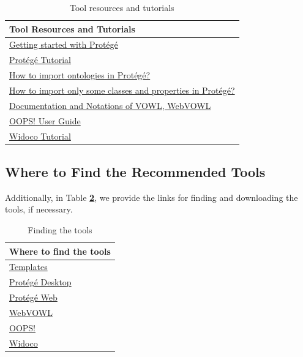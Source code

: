 \documentclass{guideline/sty/rapport}
\begin{document}
\begin{table}[H]
	\centering
	\begin{tabular}{l}
		\hline
		\rowcolor{oceanboatblue!20} 
		\textbf{Tool Resources and Tutorials} \\
		\hline
		\href{http://protegeproject.github.io/protege/getting-started/}{Getting started with Protégé} \\
		\href{https://buildmedia.readthedocs.org/media/pdf/go-protege-tutorial/latest/go-protege-tutorial.pdf}{Protégé Tutorial} \\
		\href{https://protegewiki.stanford.edu/wiki/Importing_Ontologies_in_P41}{How to import ontologies in Protégé?} \\
		\href{https://stackoverflow.com/questions/44205661/how-to-import-specific-classes-and-object-properties-from-an-ontology-in-protegeQ}{How to import only some classes and properties in Protégé?} \\
		\href{http://vowl.visualdataweb.org/v2/}{Documentation and Notations of VOWL, WebVOWL} \\
		\href{https://oops.linkeddata.es/OOPSUserGuidev1.pdf}{OOPS! User Guide} \\
		\href{https://dgarijo.github.io/Widoco/doc/tutorial/}{Widoco Tutorial} \\
		\hline
	\end{tabular}
    \caption{Tool resources and tutorials} 
	\label{tab:toolresources}
\end{table}

\newpage
\subsection{Where to Find the Recommended Tools}
Additionally, in Table \textbf{\ref{tab:findingtools}}, we provide the links for finding and downloading the tools, if necessary.

\begin{table}[H]
	\centering
	\begin{tabular}{l}
		\hline
		\rowcolor{oceanboatblue!20} 
		\textbf{Where to find the tools} \\
		\hline
		\href{https://drive.google.com/drive/folders/1xwtJYaNQIGd1TWdWayciCiH5wcpnSDxw?usp=sharing}{Templates} \\
		\href{https://protege.stanford.edu/products.php#desktop-protege}{Protégé Desktop} \\
		\href{https://webprotege.stanford.edu}{Protégé Web} \\
		\href{https://service.tib.eu/webvowl/}{WebVOWL} \\
		\href{https://oops.linkeddata.es}{OOPS!} \\
		\href{https://github.com/dgarijo/WIDOCO/releases/tag/v1.4.17}{Widoco} \\
		\hline
	\end{tabular}
    \caption{Finding the tools} 
	\label{tab:findingtools}
\end{table}
\end{document}
